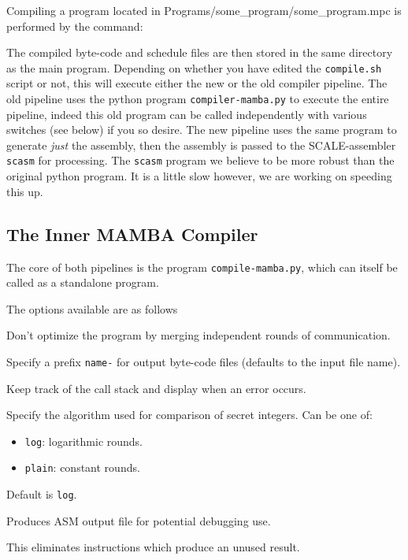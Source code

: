 Compiling a program located in Programs/some\_program/some\_program.mpc is performed by the
command:


\noindent The compiled byte-code and schedule files are then stored in the
same directory as the main program.
Depending on whether you have edited the \verb+compile.sh+ script or
not, this will execute either the new or the old compiler pipeline.
The old pipeline uses the python program \verb+compiler-mamba.py+ to
execute the entire pipeline, indeed this old program can be called independently
with various switches (see below) if you so desire.
The new pipeline uses the same program to generate {\em just} the
assembly, then the assembly is passed to the SCALE-assembler \verb+scasm+ for
processing. The \verb+scasm+ program we believe to be more robust than the
original python program. It is a little slow however, we are working on
speeding this up.

\subsection{The Inner MAMBA Compiler}
The core of both pipelines is the program \verb+compile-mamba.py+,
which can itself be called as a standalone program.


\noindent
The options available are as follows

Don't optimize the program by merging independent rounds of communication.

Specify a prefix \verb|name-| for output byte-code files (defaults to the input file name).

Keep track of the call stack and display when an error occurs.

Specify the algorithm used for comparison of secret integers. Can be one of:
\begin{itemize}
\item \verb|log|: logarithmic rounds.
\item \verb|plain|: constant rounds.
\end{itemize}
Default is \verb|log|.

Produces ASM output file for potential debugging use.

This eliminates instructions which produce an unused result.

